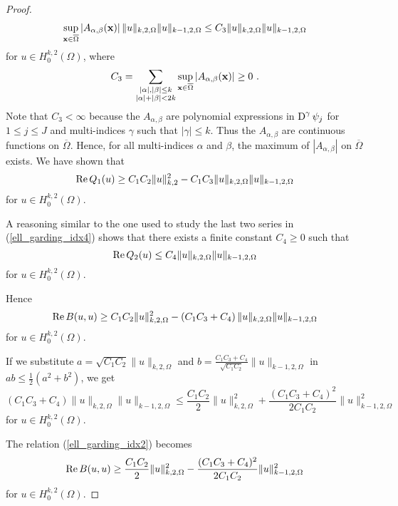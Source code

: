 \begin{proof}
\begin{align*}
\sup_{\mathbf{x} \in \overline{\Omega}} \left| A_{\alpha,\beta}(\mathbf{x})\right|
\|u\|_{k,2,\Omega} \|u\|_{k-1,2,\Omega}
\leq C_3 \|u\|_{k,2,\Omega} \|u\|_{k-1,2,\Omega} 
\end{align*}
for $\displaystyle u \in H^{k,2}_0(\Omega)$, where
\[
C_3 = \sum_{\substack{|\alpha|,|\beta|\leq k\\|\alpha|+|\beta|<2k}}
\sup_{\mathbf{x} \in \overline{\Omega}} \left| A_{\alpha,\beta}(\mathbf{x})\right|
\geq 0 \  .
\]
Note that $C_3 < \infty$ because the $A_{\alpha,\beta}$ are
polynomial expressions in $\displaystyle \operatorname{D}^\gamma \psi_j$ for
$1\leq j \leq J$ and 
multi-indices $\gamma$ such that $|\gamma|\leq k$.  Thus the
$A_{\alpha,\beta}$ are continuous functions on $\overline{\Omega}$.  Hence, for
all multi-indices $\alpha$ and $\beta$, the maximum of $|A_{\alpha,\beta}|$
on $\overline{\Omega}$ exists.  We have shown that
\[
\operatorname{Re} Q_1(u) \geq C_1C_2 \|u\|_{k,2}^2
- C_1C_3 \|u\|_{k,2,\Omega} \|u\|_{k-1,2,\Omega} 
\]
for $\displaystyle u \in H^{k,2}_0(\Omega)$.

A reasoning similar to the one used to study the last two series in
(\ref{ell_garding_idx4}) shows that there exists a finite constant
$C_4 \geq 0$ such that
\[
\operatorname{Re} Q_2(u) \leq C_4 \|u\|_{k,2,\Omega} \|u\|_{k-1,2,\Omega} 
\]
for $\displaystyle u \in H^{k,2}_0(\Omega)$.

Hence
\begin{equation} \label{ell_garding_idx2}
\operatorname{Re} B(u,u) \geq C_1C_2 \|u\|_{k,2,\Omega}^2 - \left( C_1C_3 + C_4\right)
\|u\|_{k,2,\Omega} \|u\|_{k-1,2,\Omega}
\end{equation}
for $\displaystyle u \in H^{k,2}_0(\Omega)$.

If we substitute $a= \sqrt{C_1C_2} \|u\|_{k,2,\Omega}$ and
$\displaystyle b = \frac{C_1C_3 + C_4}{\sqrt{C_1C_2}}\|u\|_{k-1,2,\Omega}$ in
$\displaystyle ab \leq \frac{1}{2}(a^2+b^2)$, we get
\[
\left( C_1C_3 + C_4\right) \|u\|_{k,2,\Omega} \|u\|_{k-1,2,\Omega}
\leq \frac{C_1C_2}{2} \|u\|_{k,2,\Omega}^2 +
\frac{(C_1C_3 + C_4)^2}{2C_1C_2}\|u\|_{k-1,2,\Omega}^2
\]
for $\displaystyle u \in H^{k,2}_0(\Omega)$.

The relation (\ref{ell_garding_idx2}) becomes
\begin{equation} \label{ell_garding_idx3}
\operatorname{Re} B(u,u) \geq \frac{C_1C_2}{2} \|u\|_{k,2,\Omega}^2
 - \frac{(C_1C_3 + C_4)^2}{2C_1C_2}\|u\|_{k-1,2,\Omega}^2
\end{equation}
for $\displaystyle u \in H^{k,2}_0(\Omega)$.


\end{proof}
